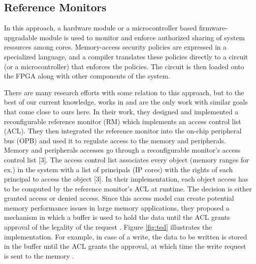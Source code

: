 \documentclass[sigconf]{acmart}
\theoremstyle{plain}
\theoremstyle{remark}
\begin{document}
\subsection{Reference Monitors}
In this approach, a hardware module or a microcontroller based firmware-upgradable module is used to monitor and enforce authorized sharing of system
resources among cores. Memory-access security policies are expressed in a specialized language, and a compiler translates these policies directly to a circuit (or a microcontroller) that enforces the policies. The circuit is then loaded onto the FPGA along with other components of the system.

There are many research efforts with some relation to this approach, but to the best of our current knowledge, works in \cite{HuffEmbedded} and \cite{Huffmire} are the only work with similar goals that come close to ours here. In their work, they designed and implemented a reconfigurable reference monitor (RM) which implements an access control list (ACL). They then integrated the reference monitor into the on-chip peripheral bus (OPB) and used it to regulate access to the memory and peripherals. Memory and peripherals accesses go through a reconfigurable monitor's access control list [3]. The access control list associates every object (memory ranges for ex.) in the system with a list of principals (IP cores) with the rights of each principal to access the object [3]. In their implementation, each object access has to be computed by the reference monitor's ACL at runtime. The decision is either granted access or denied access. Since this access model can create potential memory performance issues in large memory applications, they proposed a mechanism in which a buffer is used to hold the data until the ACL grants approval of the legality of the request \cite{SPHuffmire}. Figure \ref{fig:ted} illustrates the implementation. For example, in case of a write, the data to be written is stored in the buffer until the ACL grants the approval, at which time the write request is sent to the memory \cite{SPHuffmire}.
\end{document}
